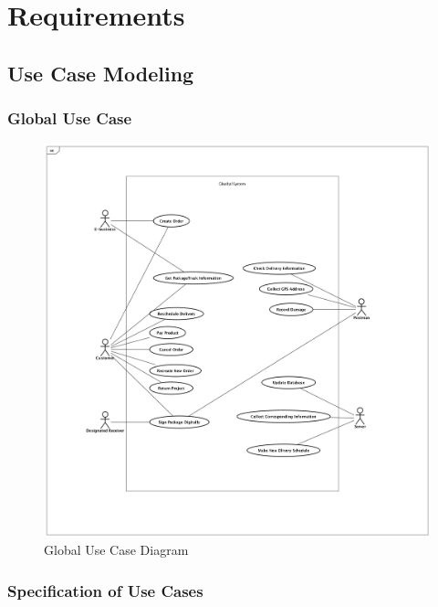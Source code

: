 \documentclass[12pt]{scrreprt}
\begin{document}
\chapter{Requirements}
\section{Use Case Modeling}
\subsection{Global Use Case}
\begin{figure}[H]
  \centering\includegraphics[width=5.5in]{DocumentRes/0UseCaseDiagram.png}
  \caption{Global Use Case Diagram}
\end{figure}

\subsection{Specification of Use Cases}
\end{document}
